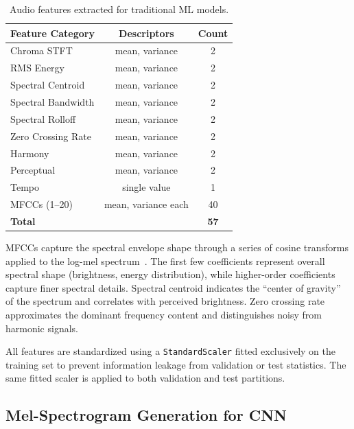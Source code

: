 \documentclass[10pt,journal]{IEEEtran}
\begin{document}
\begin{table}[ht]
\centering
\caption{Audio features extracted for traditional ML models.}
\label{tab:features}
\begin{tabular}{@{}lcc@{}}
\toprule
\textbf{Feature Category} & \textbf{Descriptors} & \textbf{Count} \\
\midrule
Chroma STFT & mean, variance & 2 \\
RMS Energy & mean, variance & 2 \\
Spectral Centroid & mean, variance & 2 \\
Spectral Bandwidth & mean, variance & 2 \\
Spectral Rolloff & mean, variance & 2 \\
Zero Crossing Rate & mean, variance & 2 \\
Harmony & mean, variance & 2 \\
Perceptual & mean, variance & 2 \\
Tempo & single value & 1 \\
MFCCs (1--20) & mean, variance each & 40 \\
\midrule
\textbf{Total} & & \textbf{57} \\
\bottomrule
\end{tabular}
\end{table}

MFCCs capture the spectral envelope shape through a series of cosine transforms applied to the log-mel spectrum~\cite{davis1980comparison}. The first few coefficients represent overall spectral shape (brightness, energy distribution), while higher-order coefficients capture finer spectral details. Spectral centroid indicates the ``center of gravity'' of the spectrum and correlates with perceived brightness. Zero crossing rate approximates the dominant frequency content and distinguishes noisy from harmonic signals.

All features are standardized using a \texttt{StandardScaler} fitted exclusively on the training set to prevent information leakage from validation or test statistics. The same fitted scaler is applied to both validation and test partitions.

\subsection{Mel-Spectrogram Generation for CNN}
\end{document}
